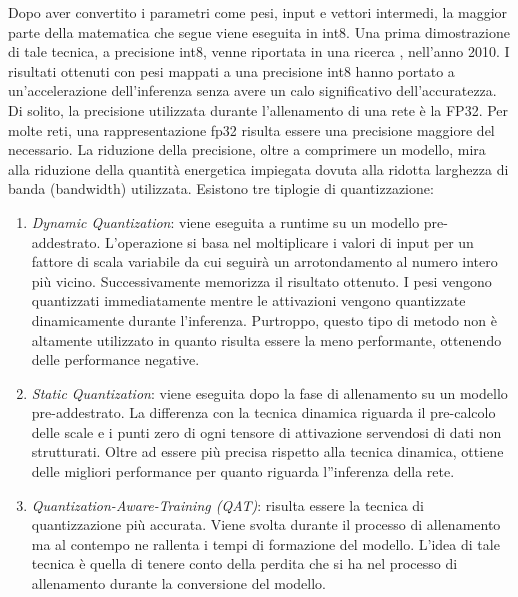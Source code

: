 Dopo aver convertito i parametri come pesi, input e vettori intermedi, la maggior parte della matematica che segue viene eseguita in int8.
Una prima dimostrazione di tale tecnica, a precisione int8, venne riportata in una ricerca \cite{37631}, nell'anno 2010. I risultati ottenuti con pesi mappati a una precisione int8 hanno portato a un'accelerazione dell'inferenza senza avere un calo significativo dell'accuratezza.
Di solito, la precisione utilizzata durante l'allenamento di una rete è la FP32. Per molte reti, una rappresentazione fp32 risulta essere una precisione maggiore del necessario.
La riduzione della precisione, oltre a comprimere un modello, mira alla riduzione della quantità energetica impiegata dovuta alla ridotta larghezza di banda (bandwidth) utilizzata.
Esistono tre tiplogie di quantizzazione:
\begin{enumerate}
    \item \emph{Dynamic Quantization}: viene eseguita a runtime su un modello pre-addestrato. L'operazione si basa nel moltiplicare i valori di input per un fattore di scala variabile da cui seguirà un arrotondamento al numero intero più vicino. Successivamente memorizza il risultato ottenuto. I pesi vengono quantizzati immediatamente mentre le attivazioni vengono quantizzate dinamicamente durante l'inferenza. Purtroppo, questo tipo di metodo non è altamente utilizzato in quanto risulta essere la meno performante, ottenendo delle performance negative.
    \item \emph{Static Quantization}: viene eseguita dopo la fase di allenamento su un modello pre-addestrato. La differenza con la tecnica dinamica riguarda il pre-calcolo delle scale e i punti zero di ogni tensore di attivazione servendosi di dati non strutturati. Oltre ad essere più precisa rispetto alla tecnica dinamica, ottiene delle migliori performance per quanto riguarda l''inferenza della rete.
    \item \emph{Quantization-Aware-Training (QAT)}: risulta essere la tecnica di quantizzazione più accurata. Viene svolta durante il processo di allenamento ma al contempo ne rallenta i tempi di formazione del modello. L'idea di tale tecnica è quella di tenere conto della perdita che si ha nel processo di allenamento durante la conversione del modello.
    
\end{enumerate}



